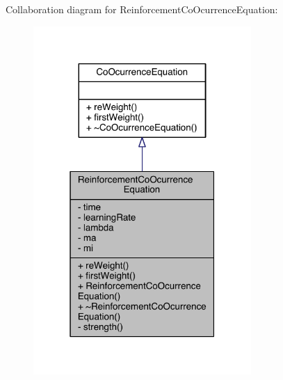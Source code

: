 Collaboration diagram for Reinforcement\+Co\+Ocurrence\+Equation\+:
\nopagebreak
\begin{figure}[H]
\begin{center}
\leavevmode
\includegraphics[width=235pt]{class_reinforcement_co_ocurrence_equation__coll__graph}
\end{center}
\end{figure}


